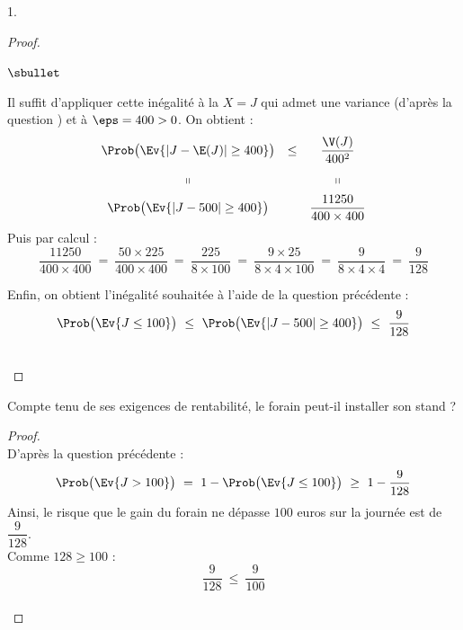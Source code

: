 \begin{noliste}{1.}
\begin{proof}
\begin{noliste}{$\sbullet$}
    \item Il suffit d'appliquer cette inégalité à la \var $X = J$ qui
      admet une variance (d'après la question ) et à $\eps =
      400 > 0$. On obtient :
      \[
      \begin{array}{cccc}
        \Prob\big( \Ev{|J - \E(J)| \geq 400} \big) & \leq &
        \dfrac{\V(J)}{400^2} 
        \\[.4cm]
        \shortparallel & & \shortparallel
        \\[.2cm]
        \Prob\big( \Ev{|J - 500| \geq 400} \big) & &
        \dfrac{11250}{400 \times 400}        
      \end{array}        
      \]
      Puis par calcul :
      \[
      \dfrac{11250}{400 \times 400} \ = \ \dfrac{50 \times 225}{400
        \times 400} \ = \ \dfrac{225}{8\times 100} \ = \ \dfrac{9
        \times 25}{8\times 4 \times 100} \ = \ \dfrac{9}{8\times 4
        \times 4} \ = \ \dfrac{9}{128}
      \]

    \item Enfin, on obtient l'inégalité souhaitée à l'aide de la
      question précédente :
      \[
      \Prob\big(\Ev{ J \leq 100}\big) \ \leq \ \Prob\big( \Ev{|J-500|\geq
        400} \big) \ \leq \ \dfrac{9}{128}
      \]
    \end{noliste}
    ~\\[-1cm]
  \end{proof}

\item Compte tenu de ses exigences de rentabilité, le forain peut-il
  installer son stand ?

  \begin{proof}~\\%
    D'après la question précédente :
    \[
    \Prob\big(\Ev{ J > 100}\big) \ = \ 1 - \Prob\big(\Ev{ J \leq
      100}\big) \ \geq \ 1 - \dfrac{9}{128}
    \]
    Ainsi, le risque que le gain du forain ne dépasse $100$ euros sur
    la journée est de $\dfrac{9}{128}$.\\
    Comme $128 \geq 100$ :
    \[
    \dfrac{9}{128} \ \leq \ \dfrac{9}{100}
    \]
    ~\\[-1cm]
  \end{proof}
\end{noliste}
